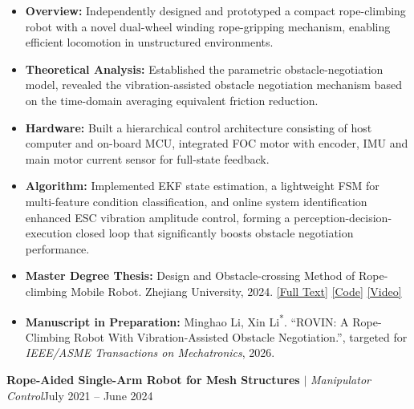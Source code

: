 \documentclass[10pt,a4paper]{article}
\begin{document}
\begin{itemize}[leftmargin=*, itemsep=0pt, parsep=0pt, topsep=2pt]
    \item \textbf{Overview: }Independently designed and prototyped a compact rope-climbing robot with a novel dual-wheel winding rope-gripping mechanism, enabling efficient locomotion in unstructured environments.
    \item \textbf{Theoretical Analysis: }Established the parametric obstacle-negotiation model, revealed the vibration-assisted obstacle negotiation mechanism based on the time-domain averaging equivalent friction reduction.
    \item \textbf{Hardware: }Built a hierarchical control architecture consisting of host computer and on-board MCU, integrated FOC motor with encoder, IMU and main motor current sensor for full-state feedback.
    \item \textbf{Algorithm:} Implemented EKF state estimation, a lightweight FSM for multi-feature condition classification, and online system identification enhanced ESC vibration amplitude control, forming a perception-decision-execution closed loop that significantly boosts obstacle negotiation performance.


    \item\textbf{Master Degree Thesis:} Design and Obstacle-crossing Method of Rope-climbing Mobile Robot. Zhejiang University, 2024.
       \href{https://你的论文链接}{[Full Text]} \href{https://你的代码仓库}{[Code]} \href{https://你的实验视频}{[Video]}
    
    \item\textbf{Manuscript in Preparation:} Minghao Li, Xin Li\textsuperscript{*}. ``ROVIN: A Rope-Climbing Robot With Vibration-Assisted Obstacle Negotiation.'', targeted for \textit{IEEE/ASME Transactions on Mechatronics}, 2026.

\end{itemize}



\noindent
\textbf{Rope-Aided Single-Arm Robot for Mesh Structures} $\vert$ \textit{Manipulator Control}\hfill July 2021 -- June 2024
\end{document}
